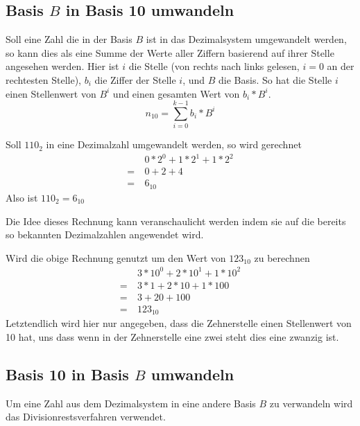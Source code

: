 \documentclass{article}
\begin{document}
\subsection{Basis $B$ in Basis 10 umwandeln}
Soll eine Zahl die in der Basis $B$ ist in das Dezimalsystem umgewandelt werden, so kann dies als eine Summe der Werte aller Ziffern basierend auf ihrer Stelle angesehen werden. Hier ist $i$ die Stelle (von rechts nach links gelesen, $i=0$ an der rechtesten Stelle), $b_i$ die Ziffer der Stelle $i$, und $B$ die Basis. So hat die Stelle $i$ einen Stellenwert von $B^i$ und einen gesamten Wert von $b_i * B^i$.
\[
 n_{10} = \sum_{i=0}^{k-1} b_i * B^i
\]
\begin{zexample}
Soll $110_2$ in eine Dezimalzahl umgewandelt werden, so wird gerechnet
\begin{align*}
   &0*2^0 + 1*2^1 + 1*2^2 \\
 =\ &0 + 2 + 4 \\
 =\ &6_{10}
\end{align*}
Also ist $110_2 = 6_{10}$
\end{zexample}
Die Idee dieses Rechnung kann veranschaulicht werden indem sie auf die bereits so bekannten Dezimalzahlen angewendet wird.
\begin{zexample}
Wird die obige Rechnung genutzt um den Wert von $123_{10}$ zu berechnen 
\begin{align*}
   &3*10^0 + 2*10^1 + 1*10^2 \\
 =\ &3*1+2*10+1*100 \\
 =\ &3 + 20 + 100 \\
 =\ &123_{10}
\end{align*}
Letztendlich wird hier nur angegeben, dass die Zehnerstelle einen Stellenwert von 10 hat, uns dass wenn in der Zehnerstelle eine zwei steht dies eine zwanzig ist.
\end{zexample}

\subsection{Basis 10 in Basis $B$ umwandeln}
Um eine Zahl aus dem Dezimalsystem in eine andere Basis $B$ zu verwandeln wird das Divisionrestsverfahren verwendet.
\end{document}
